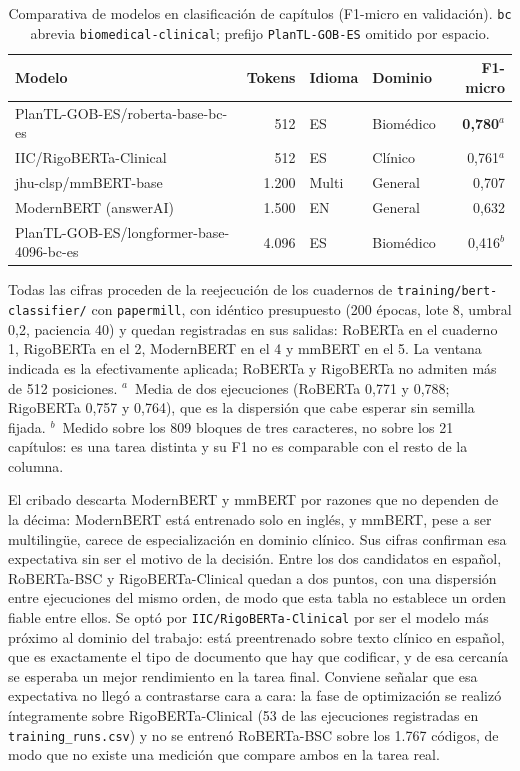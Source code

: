 \begin{table}[ht]
\centering
\small
\caption{Comparativa de modelos en clasificación de capítulos (F1-micro en validación). \texttt{bc} abrevia \texttt{biomedical-clinical}; prefijo \texttt{PlanTL-GOB-ES} omitido por espacio.}
\label{tab:modelos-capitulos}
\begin{tabular}{p{5.5cm}rllr}
\hline
\textbf{Modelo} & \textbf{Tokens} & \textbf{Idioma} & \textbf{Dominio} & \textbf{F1-micro} \\
\hline
PlanTL-GOB-ES/roberta-base-bc-es & 512 & ES & Biomédico & \textbf{0,780}$^{a}$ \\
IIC/RigoBERTa-Clinical & 512 & ES & Clínico & 0,761$^{a}$ \\
jhu-clsp/mmBERT-base & 1.200 & Multi & General & 0,707 \\
ModernBERT (answerAI) & 1.500 & EN & General & 0,632 \\
PlanTL-GOB-ES/longformer-base-4096-bc-es & 4.096 & ES & Biomédico & 0,416$^{b}$ \\
\hline
\end{tabular}

\smallskip\par\footnotesize Todas las cifras proceden de la reejecución de los cuadernos de \texttt{training/bert-classifier/} con \texttt{papermill}, con idéntico presupuesto (200 épocas, lote 8, umbral 0,2, paciencia 40) y quedan registradas en sus salidas: RoBERTa en el cuaderno 1, RigoBERTa en el 2, ModernBERT en el 4 y mmBERT en el 5. La ventana indicada es la efectivamente aplicada; RoBERTa y RigoBERTa no admiten más de 512 posiciones. $^{a}$~Media de dos ejecuciones (RoBERTa 0,771 y 0,788; RigoBERTa 0,757 y 0,764), que es la dispersión que cabe esperar sin semilla fijada. $^{b}$~Medido sobre los 809 bloques de tres caracteres, no sobre los 21 capítulos: es una tarea distinta y su F1 no es comparable con el resto de la columna.
\end{table}

El cribado descarta ModernBERT y mmBERT por razones que no dependen de la décima: ModernBERT está entrenado solo en inglés, y mmBERT, pese a ser multilingüe, carece de especialización en dominio clínico. Sus cifras confirman esa expectativa sin ser el motivo de la decisión. Entre los dos candidatos en español, RoBERTa-BSC y RigoBERTa-Clinical quedan a dos puntos, con una dispersión entre ejecuciones del mismo orden, de modo que esta tabla no establece un orden fiable entre ellos. Se optó por \texttt{IIC/RigoBERTa-Clinical} por ser el modelo más próximo al dominio del trabajo: está preentrenado sobre texto clínico en español, que es exactamente el tipo de documento que hay que codificar, y de esa cercanía se esperaba un mejor rendimiento en la tarea final. Conviene señalar que esa expectativa no llegó a contrastarse cara a cara: la fase de optimización se realizó íntegramente sobre RigoBERTa-Clinical (53 de las ejecuciones registradas en \texttt{training\_runs.csv}) y no se entrenó RoBERTa-BSC sobre los 1.767 códigos, de modo que no existe una medición que compare ambos en la tarea real.

